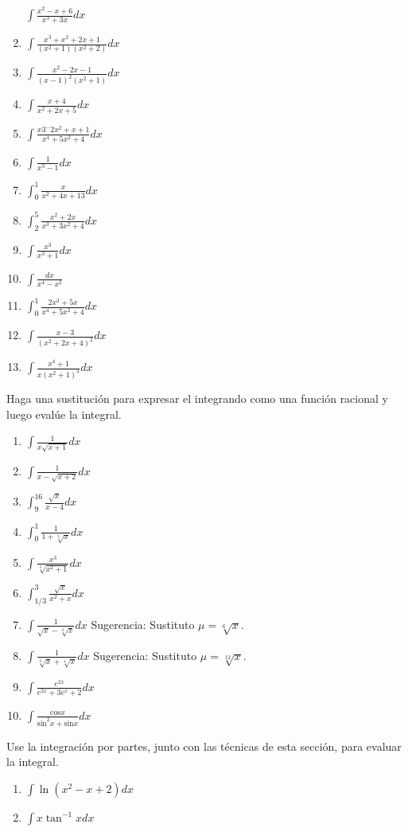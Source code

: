 \documentclass[12pt,]{article}
\begin{document}
\begin{enumerate}
  \(\displaystyle\int\frac{x^2-x+6}{x^3+3x}dx\)
\item
  \(\displaystyle\int\frac{x^3+x^2+2x+1}{(x^2+1)(x^2+2)}dx\)
\item
  \(\displaystyle\int\frac{x^2-2x-1}{(x-1)^2(x^2+1)}dx\)
\item
  \(\displaystyle\int\frac{x+4}{x^2+2x+5}dx\)
\item
  \(\displaystyle\int\frac{x3^-2x^2+x+1}{x^4+5x^2+4}dx\)
\item
  \(\displaystyle\int\frac{1}{x^3-1}dx\)
\item
  \(\displaystyle\int_0^1\frac{x}{x^2+4x+13}dx\)
\item
  \(\displaystyle\int_2^5\frac{x^2+2x}{x^3+3x^2+4}dx\)
\item
  \(\displaystyle\int\frac{x^3}{x^3+1}dx\)
\item
  \(\displaystyle\int\frac{dx}{x^4-x^2}\)
\item
  \(\displaystyle\int_0^1\frac{2x^3+5x}{x^4+5x^2+4}dx\)
\item
  \(\displaystyle\int\frac{x-3}{(x^2+2x+4)^2}dx\)
\item
  \(\displaystyle\int\frac{x^4+1}{x(x^2+1)^2}dx\)
\end{enumerate}

Haga una sustitución para expresar el integrando como una función
racional y luego evalúe la integral.

\begin{enumerate}
\def\labelenumi{\arabic{enumi}.}
\setcounter{enumi}{38}
\item
  \(\displaystyle\int\frac{1}{x\sqrt{x+1}}dx\)
\item
  \(\displaystyle\int\frac{1}{x-\sqrt{x+2}}dx\)
\item
  \(\displaystyle\int_9^{16}\frac{\sqrt{x}}{x-4}dx\)
\item
  \(\displaystyle\int_0^1\frac{1}{1+\sqrt[3]{x}}dx\)
\item
  \(\displaystyle\int\frac{x^3}{\sqrt[3]{x^2+1}}dx\)
\item
  \(\displaystyle\int_{1/3}^3\frac{\sqrt{x}}{x^2+x}dx\)
\item
  \(\displaystyle\int\frac{1}{\sqrt{x}-\sqrt[3]{x}}dx\) Sugerencia:
  Sustituto \(\mu=\sqrt[6]{x}.\)
\item
  \(\displaystyle\int\frac{1}{\sqrt[3]{x}+\sqrt[4]{x}}dx\) Sugerencia:
  Sustituto \(\mu=\sqrt[12]{x}.\)
\item
  \(\displaystyle\int\frac{e^{2x}}{e^{2x}+3e^x+2}dx\)
\item
  \(\displaystyle\int\frac{\text{cos}x}{\text{sin}^2x+\text{sin}x}dx\)
\end{enumerate}

Use la integración por partes, junto con las técnicas de esta sección,
para evaluar la integral.

\begin{enumerate}
\def\labelenumi{\arabic{enumi}.}
\setcounter{enumi}{48}
\item
  \(\displaystyle\int\ln (x^2-x+2)dx\)
\item
  \(\displaystyle\int x\tan^{-1}xdx\)
\end{enumerate}
\end{document}
